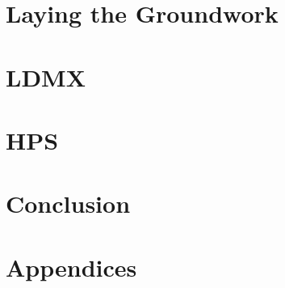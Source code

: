 \documentclass[11pt, oneside]{mnthesis}
\begin{document}



\part{Laying the Groundwork}



\part{LDMX} \label{part:ldmx}




\part{HPS} \label{part:hps}





\part{Conclusion} \label{part:conclusion}




\part{Appendices}
\appendix
\todos

\end{document}
